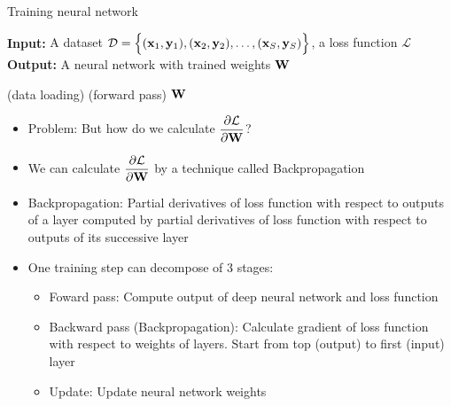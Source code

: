 \documentclass[14pt, a4paper]{article}
\numberwithin{equation}{section}
\numberwithin{algorithm}{section}
\numberwithin{figure}{section}
\begin{document}
\begin{algorithm}[h!]
  \caption{Training neural network}
  \hspace*{\algorithmicindent} \textbf{Input:} {A dataset $\mathcal{D}=\Big\lbrace (\bold{x}_1, \bold{y}_1), (\bold{x}_2, \bold{y}_2), \dots, (\bold{x}_S, \bold{y}_S) \Big\rbrace$, a loss function $\mathcal{L}$} \\
  \hspace*{\algorithmicindent} \textbf{Output:} {A neural network with trained weights $\bold{W}$}
  \begin{algorithmic}[1]
       (data loading)
       (forward pass)
    \EndWhile
    \State \Return $\bold{W}$
  \end{algorithmic}
\end{algorithm}

\begin{itemize}
  \item Problem: But how do we calculate $\dfrac{\partial \mathcal{L}}{\partial \bold{W}}$?
  \item We can calculate $\dfrac{\partial \mathcal{L}}{\partial \bold{W}}$ by a technique called Backpropagation
\end{itemize}

\begin{itemize}
  \item Backpropagation: Partial derivatives of loss function with respect to outputs of a layer computed by partial derivatives of loss function with respect to outputs of its successive layer
    \item One training step can decompose of 3 stages:
  \begin{itemize}
    \item Foward pass: Compute output of deep neural network and loss function
       \item Backward pass (Backpropagation): Calculate gradient of loss function with respect to weights of layers. Start from top (output) to first (input) layer
        \item Update: Update neural network weights
  \end{itemize}
\end{itemize}
\end{document}

